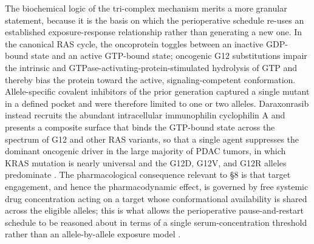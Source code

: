 The biochemical logic of the tri-complex mechanism merits a more granular
statement, because it is the basis on which the perioperative schedule re-uses an
established exposure-response relationship rather than generating a new one. In
the canonical RAS cycle, the oncoprotein toggles between an inactive
GDP-bound state and an active GTP-bound state; oncogenic G12 substitutions
impair the intrinsic and GTPase-activating-protein-stimulated hydrolysis of GTP
and thereby bias the protein toward the active, signaling-competent
conformation. Allele-specific covalent inhibitors of the prior generation
captured a single mutant in a defined pocket and were therefore limited to one or
two alleles. Daraxonrasib instead recruits the abundant intracellular
immunophilin cyclophilin A and presents a composite surface that binds the
GTP-bound state across the spectrum of G12 and other RAS variants, so that a
single agent suppresses the dominant oncogenic driver in the large majority of
PDAC tumors, in which KRAS mutation is nearly universal and the G12D, G12V, and
G12R alleles predominate \cite{daraxwhipple,pdac060s2030}. The pharmacological
consequence relevant to \S 8 is that target engagement, and hence the
pharmacodynamic effect, is governed by free systemic drug concentration acting on
a target whose conformational availability is shared across the eligible alleles;
this is what allows the perioperative pause-and-restart schedule to be reasoned
about in terms of a single serum-concentration threshold rather than an
allele-by-allele exposure model \cite{onpremwhippl,qspmetpancre}.

